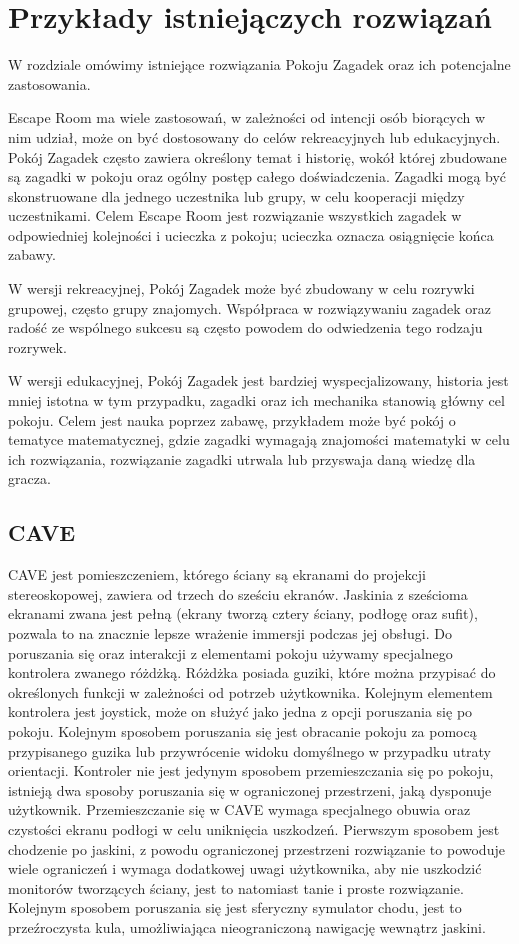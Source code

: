 \chapter{Przykłady istniejączych rozwiązań}
\label{chap:field}

W rozdziale omówimy istniejące rozwiązania Pokoju Zagadek oraz ich potencjalne zastosowania.

Escape Room ma wiele zastosowań, w zależności od intencji osób biorących w nim udział, może on być dostosowany do celów rekreacyjnych lub edukacyjnych. Pokój Zagadek często zawiera określony temat i historię, wokół której zbudowane są zagadki w pokoju oraz ogólny postęp całego doświadczenia. 
Zagadki mogą być skonstruowane dla jednego uczestnika lub grupy, w celu kooperacji między uczestnikami. Celem Escape Room jest rozwiązanie wszystkich zagadek w odpowiedniej kolejności i ucieczka z pokoju; ucieczka oznacza osiągnięcie końca zabawy.

W wersji rekreacyjnej, Pokój Zagadek może być zbudowany w celu rozrywki grupowej, często grupy znajomych. Współpraca w rozwiązywaniu zagadek oraz radość ze wspólnego sukcesu są często powodem do odwiedzenia tego rodzaju rozrywek. 

W wersji edukacyjnej, Pokój Zagadek jest bardziej wyspecjalizowany, historia jest mniej istotna w tym przypadku, zagadki oraz ich mechanika stanowią główny cel pokoju.
Celem jest nauka poprzez zabawę, przykładem może być pokój o tematyce matematycznej, gdzie zagadki wymagają znajomości matematyki w celu ich rozwiązania, rozwiązanie zagadki utrwala lub przyswaja daną wiedzę dla gracza.

\section{CAVE}
CAVE jest pomieszczeniem, którego ściany są ekranami do projekcji stereoskopowej, zawiera od trzech do sześciu ekranów.
Jaskinia z sześcioma ekranami zwana jest pełną (ekrany tworzą cztery ściany, podłogę oraz sufit), pozwala to na znacznie lepsze wrażenie immersji podczas jej obsługi.
Do poruszania się oraz interakcji z elementami pokoju używamy specjalnego kontrolera zwanego różdżką. Różdżka posiada guziki, które można przypisać do określonych funkcji w zależności od potrzeb użytkownika. Kolejnym elementem kontrolera jest joystick, może on służyć jako jedna z opcji poruszania się po pokoju. Kolejnym sposobem poruszania się jest obracanie pokoju za pomocą przypisanego guzika lub przywrócenie widoku domyślnego w przypadku utraty orientacji.
Kontroler nie jest jedynym sposobem przemieszczania się po pokoju, istnieją dwa sposoby poruszania się w ograniczonej przestrzeni, jaką dysponuje użytkownik. Przemieszczanie się w CAVE wymaga specjalnego obuwia oraz czystości ekranu podłogi w celu uniknięcia uszkodzeń. Pierwszym sposobem jest chodzenie po jaskini, z powodu ograniczonej przestrzeni rozwiązanie to powoduje wiele ograniczeń i wymaga dodatkowej uwagi użytkownika, aby nie uszkodzić monitorów tworzących ściany, jest to natomiast tanie i proste rozwiązanie.
Kolejnym sposobem poruszania się jest sferyczny symulator chodu, jest to przeźroczysta kula, umożliwiająca nieograniczoną nawigację wewnątrz jaskini.


